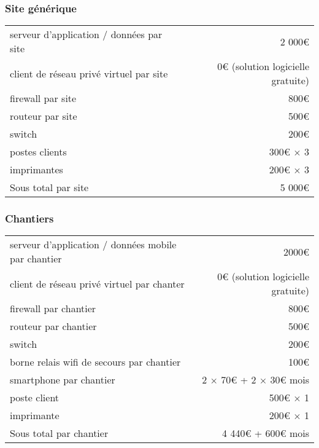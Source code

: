         \subsubsection{Site générique}
            \begin{tabular*}{\textwidth}{ l @{\extracolsep{\fill}} r }
	            serveur d'application / données par site  & 2 000€ \\ 
	            client de réseau privé virtuel par site   & 0€ (solution logicielle gratuite)\\ 
                firewall par site                         & 800€ \\ 
	            routeur par site                          & 500€ \\ 
	            switch                                    & 200€ \\ 
	            postes clients                            & 300€ $\times$ 3 \\
	            imprimantes                               & 200€ $\times$ 3 \\ \hline
	            Sous total par site                       & 5 000€
            \end{tabular*}

        \subsubsection{Chantiers}
            \begin{tabular*}{\textwidth}{ l @{\extracolsep{\fill}} r }
	            serveur d'application / données mobile par chantier     & 2000€ \\ 
	            client de réseau privé virtuel par chanter              & 0€ (solution logicielle gratuite)\\ 
	            firewall par chantier                                   & 800€ \\ 
	            routeur par chantier                                    & 500€ \\ 
	            switch                                                  & 200€ \\ 
	            borne relais wifi de secours par chantier               & 100€ \\ 
	            smartphone par chantier                                 & 2 $\times$ 70€ + 2 $\times$ 30€ \/ mois\\ 
	            poste client                                            & 500€ $\times$ 1 \\
	            imprimante                                              & 200€ $\times$ 1 \\ \hline
	            Sous total par chantier                                 & 4 440€ + 600€ \/mois
            \end{tabular*}

